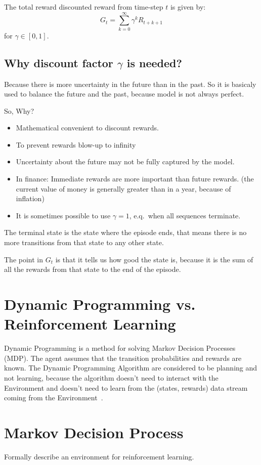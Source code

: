 The total reward discounted reward from time-step $t$ is given by:
\[
    G_t = \sum_{k=0}^{\infty} \gamma^k R_{t+k+1}
\]
for $\gamma \in [0,1]$.

\subsection{Why discount factor $\gamma$ is needed?}
Because there is more uncertainty in the future than in the past.
So it is basicaly used to balance the future and the past, because
model is not always perfect.

So, Why?
\begin{itemize}
    \item Mathematical convenient to discount rewards.
    \item To prevent rewards blow-up to infinity
    \item Uncertainty about the future may not be fully captured by the model.
    \item In finance: Immediate rewards are more important than future rewards.
    (the current value of money is generally greater than in a year, because of inflation)
    \item It is sometimes possible to use $\gamma=1$, e.q.\ when all sequences terminate.
\end{itemize}

The terminal state is the state where the episode ends, that means there
is no more transitions from that state to any other state.

The point in $G_t$ is that it tells us how good the state is, because
it is the sum of all the rewards from that state to the end of the episode. %


\section{Dynamic Programming vs. Reinforcement Learning}\label{sec:dynamic-programming-vs.-reinforcement-learning}
Dynamic Programming is a method for solving Markov Decision Processes (MDP).
The agent assumes that the transition probabilities and rewards are known.
The Dynamic Programming Algorithm are considered to be planning and not learning,
because the algorithm doesn’t need to interact with the Environment and
doesn’t need to learn from the (states, rewards) data stream coming
from the Environment~\cite[p.~28]{rao-2022}.


\section{Markov Decision Process}\label{sec:markov-decision-process}
Formally describe an environment for reinforcement learning.

